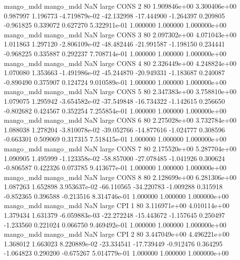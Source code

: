 mango_mdd mango_mdd                   NaN      large     CONS                 2 80 1.909846e+00   3.300406e+00      0.987997       1.196773 -4.719879e-02    -42.132998    -17.444900    -1.264397       0.209805 -0.961825   0.339072     0.627270   5.322911e-01            1.000000        1.000000        1.000000e+00
mango_mdd mango_mdd                   NaN      large     CONS                 3 80 2.097302e+00   4.071043e+00      1.011863       1.297120 -2.806109e-02    -48.482446    -21.991587    -1.198150       0.234441 -0.968225   0.335887     0.292237   7.708714e-01            1.000000        1.000000        1.000000e+00
mango_mdd mango_mdd                   NaN      large     CONS                 4 80 2.326449e+00   4.248824e+00      1.070080       1.353663 -1.491986e-02    -45.244870    -20.949331    -1.183687       0.240087 -0.890490   0.375907     0.124724   9.010589e-01            1.000000        1.000000        1.000000e+00
mango_mdd mango_mdd                   NaN      large     CONS                 5 80 2.347383e+00   3.758810e+00      1.079075       1.295942 -3.654582e-02    -37.549848    -16.734322    -1.142615       0.256650 -0.802682   0.424567     0.352254   7.255854e-01            1.000000        1.000000        1.000000e+00
mango_mdd mango_mdd                   NaN      large     CONS                 6 80 2.275028e+00   3.732784e+00      1.088038       1.278204 -3.810078e-02    -39.052766    -14.877616    -1.024777       0.308596 -0.663301   0.509069     0.317315   7.518415e-01            1.000000        1.000000        1.000000e+00
mango_mdd mango_mdd                   NaN      large     CONS                 7 80 2.175520e+00   5.287704e+00      1.090905       1.495999 -1.123358e-02    -58.857000    -27.078485    -1.041926       0.300624 -0.806587   0.422326     0.073785   9.413677e-01            1.000000        1.000000        1.000000e+00
mango_mdd mango_mdd                   NaN      large     CONS                 8 80 2.128699e+00   6.281306e+00      1.087263       1.652898  3.953637e-02    -66.110565    -34.220783    -1.009288       0.315918 -0.852365   0.396588    -0.213516   8.314746e-01            1.000000        1.000000        1.000000e+00
mango_mdd mango_mdd                   NaN      large      CPI                 1 80 3.116971e+00   4.010114e+00      1.379434       1.631379 -6.059883e-03    -22.272248    -15.443672    -1.157645       0.250497 -1.233560   0.221024     0.066750   9.469492e-01            1.000000        1.000000        1.000000e+00
mango_mdd mango_mdd                   NaN      large      CPI                 2 80 3.447049e+00   4.496221e+00      1.368012       1.663023  8.220889e-02    -23.334541    -17.739449    -0.912476       0.364295 -1.064823   0.290200    -0.675267   5.014779e-01            1.000000        1.000000        1.000000e+00
